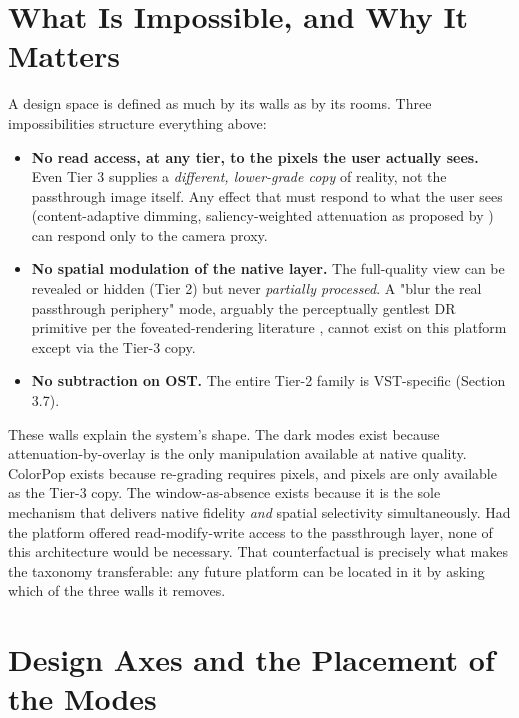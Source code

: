 
\section{What Is Impossible, and Why It Matters}

A design space is defined as much by its walls as by its rooms. Three impossibilities structure
everything above:

\begin{itemize}
\item \textbf{No read access, at any tier, to the pixels the user actually sees.} Even Tier 3 supplies a
\textit{different, lower-grade copy} of reality, not the passthrough image itself. Any effect that must
respond to what the user sees (content-adaptive dimming, saliency-weighted attenuation as proposed
by \citealp{lu2012}) can respond only to the camera proxy.
\item \textbf{No spatial modulation of the native layer.} The full-quality view can be revealed or hidden
(Tier 2) but never \textit{partially processed}. A "blur the real passthrough periphery" mode, arguably
the perceptually gentlest DR primitive per the foveated-rendering literature \citep{patney2016},
cannot exist on this platform except via the Tier-3 copy.
\item \textbf{No subtraction on OST.} The entire Tier-2 family is VST-specific (Section 3.7).
\end{itemize}

These walls explain the system's shape. The dark modes exist because attenuation-by-overlay is the
only manipulation available at native quality. ColorPop exists because re-grading requires pixels,
and pixels are only available as the Tier-3 copy. The window-as-absence exists because it is the sole
mechanism that delivers native fidelity \textit{and} spatial selectivity simultaneously. Had the platform
offered read-modify-write access to the passthrough layer, none of this architecture would be
necessary. That counterfactual is precisely what makes the taxonomy transferable: any future
platform can be located in it by asking which of the three walls it removes.

\section{Design Axes and the Placement of the Modes}

